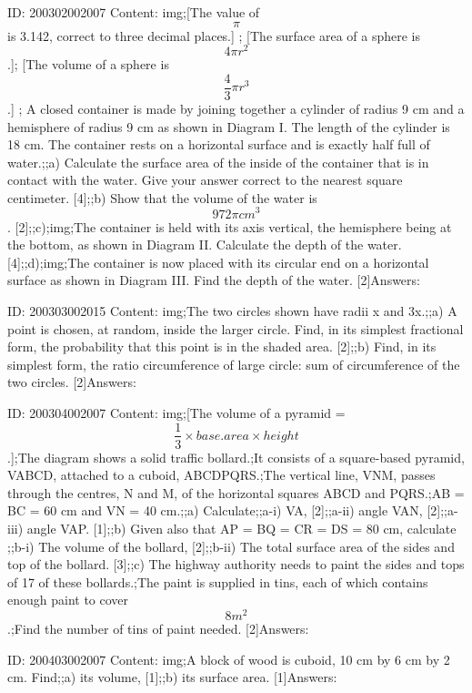 \documentclass{article}
\begin{document}
ID: 200302002007
Content:
img;[The value of $$\pi$$ is 3.142, correct to three decimal places.] ; [The surface area of a sphere is $$4 \pi r^{2} $$.]; [The volume of a sphere is $$\frac{4}{3} \pi r^{3} $$.] ; A closed container is made by joining together a cylinder of radius 9 cm and a hemisphere of radius 9 cm as shown in Diagram I. The length of the cylinder is 18 cm. The container rests on a horizontal surface and is exactly half full of water.;;a) Calculate the surface area of the inside of the container that is in contact with the water. Give your answer correct to the nearest square centimeter. [4];;b) Show that the volume of the water is $$972\pi cm^{3} $$. [2];;c);img;The container is held with its axis vertical, the hemisphere being at the bottom, as shown in Diagram II. Calculate the depth of the water. [4];;d);img;The container is now placed with its circular end on a horizontal surface as shown in Diagram III. Find the depth of the water. [2]Answers:

ID: 200303002015
Content:
img;The two circles shown have radii x and 3x.;;a) A point is chosen, at random, inside the larger circle. Find, in its simplest fractional form, the probability that this point is in the shaded area.   [2];;b) Find, in its simplest form, the ratio circumference of large circle: sum of circumference of the two circles.   [2]Answers:

ID: 200304002007
Content:
img;[The volume of a pyramid = $$\frac{1}{3} \times base.area \times height$$.];The diagram shows a solid traffic bollard.;It consists of a square-based pyramid, VABCD, attached to a cuboid, ABCDPQRS.;The vertical line, VNM, passes through the centres, N and M, of the horizontal squares ABCD and PQRS.;AB = BC = 60 cm and VN = 40 cm.;;a) Calculate;;a-i) VA,   [2];;a-ii) angle VAN,   [2];;a-iii) angle VAP.   [1];;b) Given also that AP = BQ = CR = DS = 80 cm, calculate ;;b-i) The volume of the bollard,   [2];;b-ii) The total surface area of the sides and top of the bollard.   [3];;c) The highway authority needs to paint the sides and tops of 17 of these bollards.;The paint is supplied in tins, each of which contains enough paint to cover $$8 m^2$$.;Find the number of tins of paint needed.   [2]Answers:

ID: 200403002007
Content:
img;A block of wood is cuboid, 10 cm by 6 cm by 2 cm. Find;;a) its volume, [1];;b) its surface area. [1]Answers:
\end{document}
